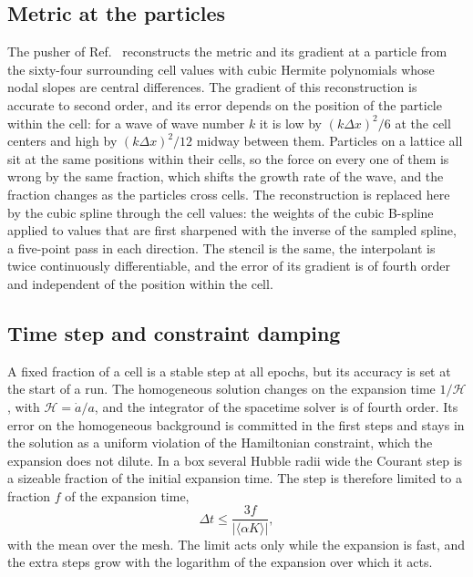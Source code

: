 \documentclass[aps,prd,twocolumn,10pt,superscriptaddress,nofootinbib,longbibliography,floatfix]{revtex4-2}
\begin{document}
\subsection{Metric at the particles}\label{sec:interp}

The pusher of Ref.~\cite{Wu:2026nrpic} reconstructs the metric and its gradient at a particle from the sixty-four surrounding cell values with cubic Hermite polynomials whose nodal slopes are central differences. The gradient of this reconstruction is accurate to second order, and its error depends on the position of the particle within the cell: for a wave of wave number $k$ it is low by $(k\Delta x)^2/6$ at the cell centers and high by $(k\Delta x)^2/12$ midway between them. Particles on a lattice all sit at the same positions within their cells, so the force on every one of them is wrong by the same fraction, which shifts the growth rate of the wave, and the fraction changes as the particles cross cells. The reconstruction is replaced here by the cubic spline through the cell values: the weights of the cubic B-spline applied to values that are first sharpened with the inverse of the sampled spline, a five-point pass in each direction. The stencil is the same, the interpolant is twice continuously differentiable, and the error of its gradient is of fourth order and independent of the position within the cell.

\subsection{Time step and constraint damping}\label{sec:step}

A fixed fraction of a cell is a stable step at all epochs, but its accuracy is set at the start of a run. The homogeneous solution changes on the expansion time $1/\mathcal{H}$, with $\mathcal{H} = \dot a/a$, and the integrator of the spacetime solver is of fourth order. Its error on the homogeneous background is committed in the first steps and stays in the solution as a uniform violation of the Hamiltonian constraint, which the expansion does not dilute. In a box several Hubble radii wide the Courant step is a sizeable fraction of the initial expansion time. The step is therefore limited to a fraction $f$ of the expansion time,
\begin{equation}
\Delta t \le \frac{3f}{|\langle \alpha K\rangle|},
\end{equation}
with the mean over the mesh. The limit acts only while the expansion is fast, and the extra steps grow with the logarithm of the expansion over which it acts.
\end{document}
